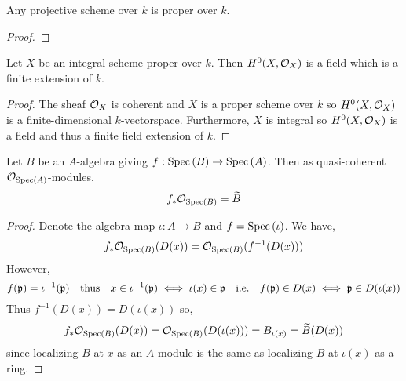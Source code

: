 \documentclass[12pt]{article}
\begin{document}
\begin{lemma} \label{projective_scheme_proper}
Any projective scheme over $k$ is proper over $k$.
\end{lemma}

\begin{proof}

\end{proof}

\begin{lemma} \label{global_sections_proper_scheme}
Let $X$ be an integral scheme proper over $k$. Then $H^0(X, \mathcal{O}_{X})$ is a field which is a finite extension of $k$. 
\end{lemma}

\begin{proof}
The sheaf $\mathcal{O}_{X}$ is coherent and $X$ is a proper scheme over $k$ so $H^0(X, \mathcal{O}_{X})$ is a finite-dimensional $k$-vectorspace. Furthermore, $X$ is integral so $H^0(X, \mathcal{O}_{X})$ is a field and thus a finite field extension of $k$.
\end{proof}

\begin{lemma}
Let $B$ be an $A$-algebra giving $f : \mathrm{Spec}\left( B \right) \to \mathrm{Spec}\left( A \right)$. Then as quasi-coherent $\mathcal{O}_{\mathrm{Spec}\left( A \right)}$-modules,
 \[ f_* \mathcal{O}_{\mathrm{Spec}\left( B \right)} = \widetilde{B} \]
\end{lemma}

\begin{proof}
Denote the algebra map $\iota : A \to B$ and $f = \mathrm{Spec}\left( \iota \right)$. We have, 
\[ f_* \mathcal{O}_{\mathrm{Spec}\left( B \right)}(D(x)) = \mathcal{O}_{\mathrm{Spec}\left( B \right)}(f^{-1}(D(x))) \] However, 
\[ f(\mathfrak{p}) = \iota^{-1}(\mathfrak{p}) \quad \text{thus} \quad x \in \iota^{-1}(\mathfrak{p}) \iff \iota(x) \in \mathfrak{p} \quad \text{i.e.} \quad f(\mathfrak{p}) \in D(x) \iff \mathfrak{p} \in D(\iota(x)) \] Thus $f^{-1}(D(x)) = D(\iota(x))$ so,
\[ f_* \mathcal{O}_{\mathrm{Spec}\left( B \right)}(D(x)) = \mathcal{O}_{\mathrm{Spec}\left( B \right)}(D(\iota(x))) = B_{\iota(x)}  = \widetilde{B}(D(x)) \]
since localizing $B$ at $x$ as an $A$-module is the same as localizing $B$ at $\iota(x)$ as a ring.
\end{proof}
\end{document}
